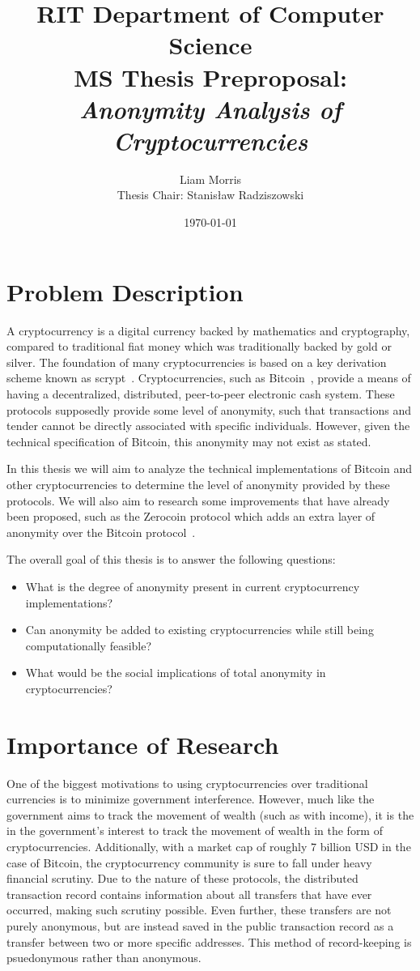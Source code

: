 \documentclass[11pt]{artikel3}
\title{RIT Department of Computer Science\\MS Thesis Preproposal:\\\emph{Anonymity Analysis of Cryptocurrencies}}
\author{Liam Morris\\Thesis Chair: Stanis{\l}aw Radziszowski}
\date{\today}
\begin{document}
\nocite{*}
\maketitle

\section{Problem Description}
A cryptocurrency is a digital currency backed by mathematics and
cryptography, compared to traditional fiat money which was traditionally backed by gold
or silver. The foundation of many cryptocurrencies is based on a key derivation
scheme known as scrypt~\cite{Percival}.
Cryptocurrencies, such as Bitcoin~\cite{Nakamoto08}, provide a means of having a
decentralized, distributed, peer-to-peer electronic cash system. These protocols
supposedly provide some level of anonymity, such that transactions and tender
cannot be directly associated with specific individuals. However, given the
technical specification of Bitcoin, this anonymity may not exist as stated.

In this thesis we will aim to analyze the technical implementations of Bitcoin and
other cryptocurrencies to determine the level of anonymity provided by these protocols. We will
also aim to research some improvements that have already been proposed, such as
the Zerocoin protocol which adds an extra layer of anonymity over the Bitcoin
protocol~\cite{Miers13}.

The overall goal of this thesis is to answer the following questions:
\begin{itemize}[leftmargin=.5in]
    \item What is the degree of anonymity present in current cryptocurrency implementations?
    \item Can anonymity be added to existing cryptocurrencies while still being computationally feasible?
    \item What would be the social implications of total anonymity in cryptocurrencies?
\end{itemize}

\section{Importance of Research}
One of the biggest motivations to using cryptocurrencies over traditional
currencies is to minimize government interference. However, much like the
government aims to track the movement of wealth (such as with income), it is the
in the government's interest to track the movement of wealth in the form of
cryptocurrencies. Additionally, with a market cap of roughly 7 billion USD in
the case of Bitcoin, the cryptocurrency community is sure to fall under heavy
financial scrutiny. Due to the nature of these protocols, the distributed
transaction record contains information about all transfers that have ever
occurred, making such scrutiny possible. Even further, these transfers are not
purely anonymous, but are instead saved in the public transaction record as a
transfer between two or more specific addresses. This method of record-keeping
is psuedonymous rather than anonymous.
\end{document}
